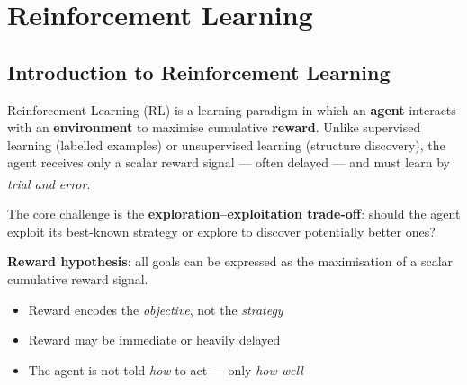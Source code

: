     \chapter{Reinforcement Learning}

    \section{Introduction to Reinforcement Learning}

    \begin{tcbitemize}[ skin=sectionraster ]

        \tcbitem[title=What is Reinforcement Learning?, raster multicolumn=4]
        Reinforcement Learning (RL) is a learning paradigm in which an
        \textbf{agent} interacts with an \textbf{environment} to maximise
        cumulative \textbf{reward}. Unlike supervised learning (labelled
        examples) or unsupervised learning (structure discovery), the agent
        receives only a scalar reward signal --- often delayed --- and must learn
        by \emph{trial and error}.\textsuperscript{\cite[][p.~323]{hurbansGrokkingArtificialIntelligence2020}}

        The core challenge is the \textbf{exploration--exploitation trade-off}:
        should the agent exploit its best-known strategy or explore to
        discover potentially better ones?

        \tcbitem[title=The Reward Hypothesis, raster multicolumn=2]
        \textbf{Reward hypothesis}: all goals can be expressed as the
        maximisation of a scalar cumulative reward signal.

        \begin{itemize}
            \item Reward encodes the \emph{objective}, not the \emph{strategy}
            \item Reward may be immediate or heavily delayed
            \item The agent is not told \emph{how} to act --- only \emph{how well}
        \end{itemize}
        \textsuperscript{\cite[][p.~324]{hurbansGrokkingArtificialIntelligence2020}}


\end{tcbitemize}
